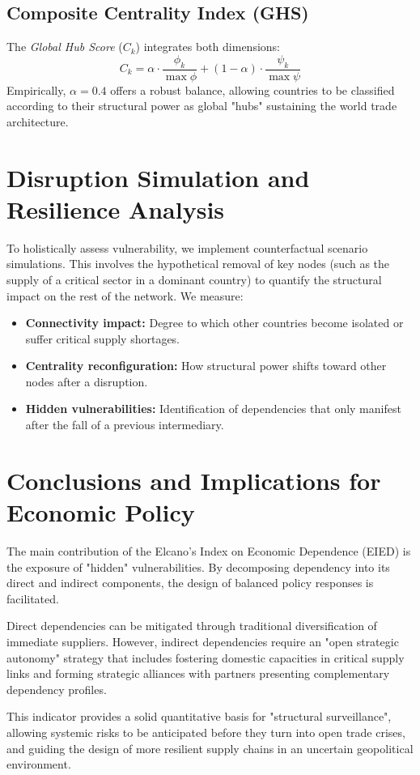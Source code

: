 \documentclass[final,1p,times,authoryear]{elsarticle}
\begin{document}
\subsection{Composite Centrality Index (GHS)}
The \textit{Global Hub Score} ($C_k$) integrates both dimensions:
\begin{equation}
C_k = \alpha \cdot \frac{\phi_k}{\max \phi} + (1-\alpha) \cdot \frac{\psi_k}{\max \psi}
\end{equation}
Empirically, $\alpha = 0.4$ offers a robust balance, allowing countries to be classified according to their structural power as global "hubs" sustaining the world trade architecture.

\section{Disruption Simulation and Resilience Analysis}

To holistically assess vulnerability, we implement counterfactual scenario simulations. This involves the hypothetical removal of key nodes (such as the supply of a critical sector in a dominant country) to quantify the structural impact on the rest of the network. We measure:
\begin{itemize}
    \item \textbf{Connectivity impact:} Degree to which other countries become isolated or suffer critical supply shortages.
    \item \textbf{Centrality reconfiguration:} How structural power shifts toward other nodes after a disruption.
    \item \textbf{Hidden vulnerabilities:} Identification of dependencies that only manifest after the fall of a previous intermediary.
\end{itemize}

\section{Conclusions and Implications for Economic Policy}

The main contribution of the Elcano's Index on Economic Dependence (EIED) is the exposure of "hidden" vulnerabilities. By decomposing dependency into its direct and indirect components, the design of balanced policy responses is facilitated.

Direct dependencies can be mitigated through traditional diversification of immediate suppliers. However, indirect dependencies require an "open strategic autonomy" strategy that includes fostering domestic capacities in critical supply links and forming strategic alliances with partners presenting complementary dependency profiles.

This indicator provides a solid quantitative basis for "structural surveillance", allowing systemic risks to be anticipated before they turn into open trade crises, and guiding the design of more resilient supply chains in an uncertain geopolitical environment.



\end{document}
